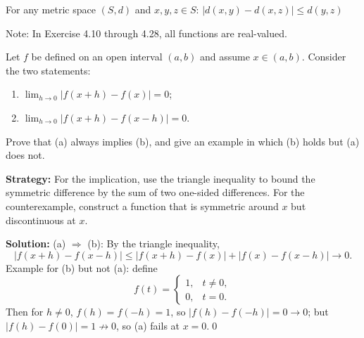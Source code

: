 \begin{theorem}
For any metric space $(S,d)$ and $x,y,z \in S$: $|d(x,y) - d(x,z)| \leq d(y,z)$
\end{theorem}

Note: In Exercise 4.10 through 4.28, all functions are real-valued.



\begin{problembox}
\begin{problemstatement}
Let $f$ be defined on an open interval $(a, b)$ and assume $x \in (a, b)$. Consider the two statements:
\begin{enumerate}[label=(\alph*)]
\item $\lim_{h \to 0} |f(x + h) - f(x)| = 0$;
\item $\lim_{h \to 0} |f(x + h) - f(x - h)| = 0$.
\end{enumerate}
Prove that (a) always implies (b), and give an example in which (b) holds but (a) does not.
\end{problemstatement}
\end{problembox}

\noindent\textbf{Strategy:} For the implication, use the triangle inequality to bound the symmetric difference by the sum of two one-sided differences. For the counterexample, construct a function that is symmetric around $x$ but discontinuous at $x$.

\bigskip\noindent\textbf{Solution:}
(a) $\Rightarrow$ (b): By the triangle inequality,
\[
|f(x+h)-f(x-h)|\le |f(x+h)-f(x)|+|f(x)-f(x-h)|\to 0.
\]
Example for (b) but not (a): define
\[
f(t)=\begin{cases}
1,& t\ne 0,\\
0,& t=0.
\end{cases}
\]
Then for $h\ne 0$, $f(h)=f(-h)=1$, so $|f(h)-f(-h)|=0\to 0$; but $|f(h)-f(0)|=1\not\to 0$, so (a) fails at $x=0$.\qed



